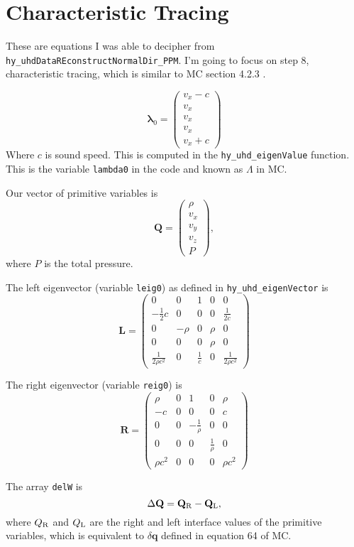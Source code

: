 \documentclass[preprint,11pt]{aastex}
\newcommand{\beq}{\begin{equation}}
\newcommand{\eeq}{\end{equation}}
\begin{document}
\section{Characteristic Tracing}
\label{sec:characteristic}
These are equations I was able to decipher from \verb!hy_uhdDataREconstructNormalDir_PPM!.  I'm going to focus on step $8$, characteristic tracing, which is similar to MC section 4.2.3 .

\beq
\mathbf{\lambda}_0 = \begin{pmatrix}v_x - c\\v_x \\ v_x \\ v_x \\ v_x + c\end{pmatrix}
\eeq
Where $c$ is sound speed.  This is computed in the \verb!hy_uhd_eigenValue! function.  This is the variable \verb!lambda0! in the code and known as $\Lambda$ in MC.  

Our vector of primitive variables is
\beq
\mathbf{Q} = \begin{pmatrix}\rho\\v_x \\ v_y \\ v_z \\ P
\end{pmatrix},
\eeq
where $P$ is the total pressure.

The left eigenvector (variable \verb!leig0!)  as defined in \verb!hy_uhd_eigenVector! is
\beq
\mathbf{L} = 
\begin{pmatrix}
0 & 0 & 1 & 0 & 0 \\
-\frac{1}{2} c & 0 & 0 & 0 & \frac{1}{2 c} \\
0 & -\rho & 0 & \rho & 0 \\
0 & 0 & 0 & \rho & 0 \\
\frac{1}{2 \rho c^2} & 0 & \frac{1}{c} & 0 & \frac{1}{2 \rho c^2}
\end{pmatrix}
\eeq

The right eigenvector (variable \verb!reig0!) is
\beq
\mathbf{R} = 
\begin{pmatrix}
\rho & 0 & 1 & 0 & \rho \\
-c & 0 & 0 & 0 & c \\
0 & 0 & -\frac{1}{\rho} & 0 & 0 \\
0 & 0 & 0 & \frac{1}{\rho} & 0 \\
\rho c^2 & 0 & 0 & 0 & \rho c^2
\end{pmatrix}
\eeq

The array \verb!delW! is
\beq
\Delta \mathbf{Q} = \mathbf{Q}_{\rm R} - \mathbf{Q}_{\rm L},
\eeq
where $Q_{\rm R}$ and $Q_{\rm L}$ are the right and left interface values of the primitive variables, which is equivalent to $\delta \mathbf{q}$ defined in equation 64 of MC.
\end{document}
